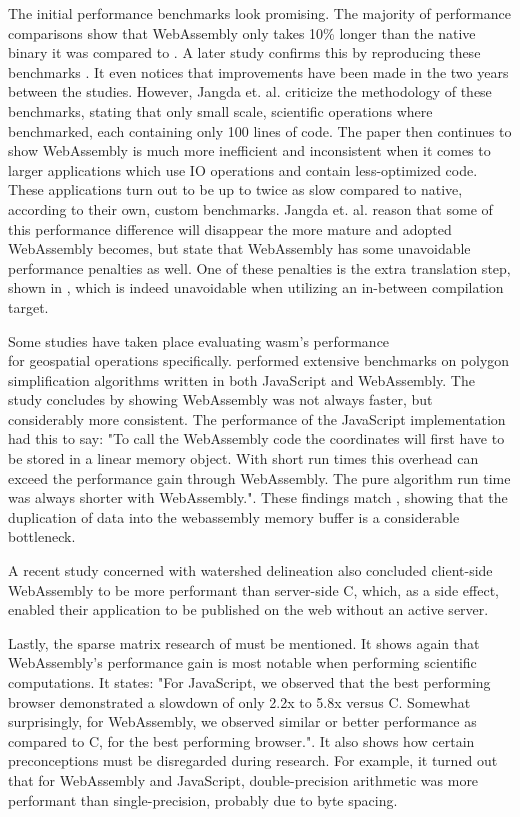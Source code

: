 The initial performance benchmarks look promising. The majority of performance comparisons show that WebAssembly only takes 10\% longer than the native binary it was compared to \citet{haas_bringing_2017}. A later study confirms this by reproducing these benchmarks \citep{jangda_not_2019}. It even notices that improvements have been made in the two years between the studies. However, Jangda et. al. criticize the methodology of these benchmarks, stating that only small scale, scientific operations where benchmarked, each containing only 100 lines of code. The paper then continues to show WebAssembly is much more inefficient and inconsistent when it comes to larger applications which use IO operations and contain less-optimized code. These applications turn out to be up to twice as slow compared to native, according to their own, custom benchmarks. 
Jangda et. al. reason that some of this performance difference will disappear the more mature and adopted WebAssembly becomes, but state that WebAssembly has some unavoidable performance penalties as well. 
One of these penalties is the extra translation step, shown in , which is indeed unavoidable when utilizing an in-between compilation target. 

Some studies have taken place evaluating \ac{wasm}'s performance  \\ for geospatial operations specifically. 
\citet{melch_performance_2019} performed extensive benchmarks on polygon simplification algorithms written in both JavaScript and WebAssembly. 
The study concludes by showing WebAssembly was not always faster, but considerably more consistent. 
The performance of the JavaScript implementation 
\citet{melch_performance_2019} had this to say: "To call the WebAssembly code the coordinates will first have to be stored in a linear memory object. 
With short run times this overhead can exceed the performance gain through WebAssembly. 
The pure algorithm run time was always shorter with WebAssembly.". 
These findings match \citet{jangda_not_2019}, showing that the duplication of data into the webassembly memory buffer is a considerable bottleneck.

A recent study concerned with watershed delineation \citep{sit_optimized_2019} also concluded client-side WebAssembly to be more performant than server-side C, which, as a side effect, enabled their application to be published on the web without an active server. 

Lastly, the sparse matrix research of \citet{sandhu_sparse_2018} must be mentioned. It shows again that WebAssembly's performance gain is most notable when performing scientific computations. It states: "For JavaScript, we observed that the best performing browser demonstrated a slowdown of only 2.2x to 5.8x versus C. Somewhat surprisingly, for WebAssembly, we observed similar or better performance as compared to C, for the best performing browser.". It also shows how certain preconceptions must be disregarded during research. For example, it turned out that for WebAssembly and JavaScript, double-precision arithmetic was more performant than single-precision, probably due to byte spacing.


